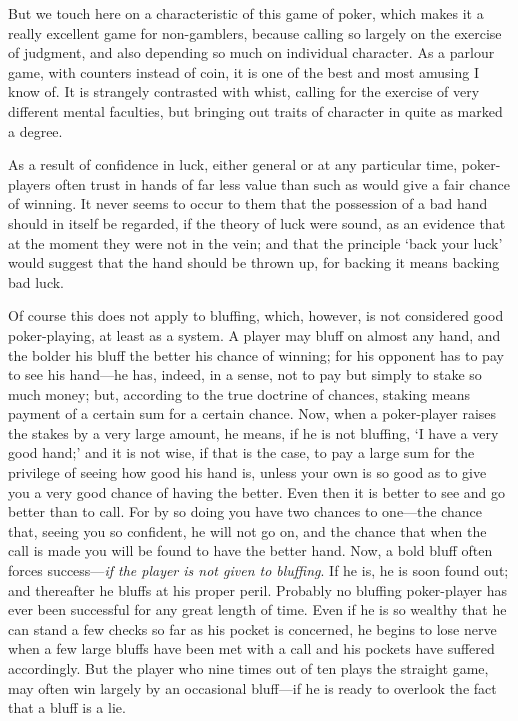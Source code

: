 \documentclass[letterpaper,12pt,oneside,openany]{memoir}
\begin{document}
But we touch here on a characteristic of this game
of poker, which makes it a really excellent game for
non-gamblers, because calling so largely on the exercise
of judgment, and also depending so much on individual
character. As a parlour game, with counters instead of
coin, it is one of the best and most amusing I know of.
It is strangely contrasted with whist, calling for the
exercise of very different mental faculties, but bringing
out traits of character in quite as marked a degree.

As a result of confidence in luck, either general or
at any particular time, poker-players often trust in
hands of far less value than such as would give a fair
chance of winning. It never seems to occur to them
that the possession of a bad hand should in itself be
regarded, if the theory of luck were sound, as an evidence
that at the moment they were not in the vein;
and that the principle `back your luck' would suggest
that the hand should be thrown up, for backing it means
backing bad luck.

Of course this does not apply to bluffing, which,
however, is not considered good poker-playing, at least
as a system. A player may bluff on almost any hand,
and the bolder his bluff the better his chance of winning;
for his opponent has to pay to see his hand---he
has, indeed, in a sense, not to pay but simply to stake
so much money; but, according to the true doctrine of
chances, staking means payment of a certain sum for a
certain chance. Now, when a poker-player raises the
stakes by a very large amount, he means, if he is not
bluffing, `I have a very good hand;' and it is not wise,
if that is the case, to pay a large sum for the privilege
of seeing how good his hand is, unless your own is so
good as to give you a very good chance of having the
better. Even then it is better to see and go better than
to call. For by so doing you have two chances to one---the
chance that, seeing you so confident, he will not
go on, and the chance that when the call is made you
will be found to have the better hand. Now, a bold
bluff often forces success---\textit{if the player is not given to
bluffing}. If he is, he is soon found out; and thereafter
he bluffs at his proper peril. Probably no bluffing
poker-player has ever been successful for any great
length of time. Even if he is so wealthy that he can
stand a few checks so far as his pocket is concerned, he
begins to lose nerve when a few large bluffs have been
met with a call and his pockets have suffered accordingly.
But the player who nine times out of ten plays the
straight game, may often win largely by an occasional
bluff---if he is ready to overlook the fact that a bluff is
a lie.
\end{document}
